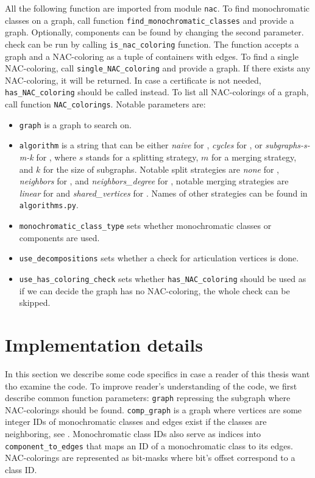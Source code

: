 All the following function are imported from module \texttt{nac}.
To find monochromatic classes on a graph,
call function \texttt{find\_monochromatic\_classes} and provide a graph.
Optionally, \trcon{} components can be found by changing the second parameter.
%
\IsNACColoring{} check can be run by calling \texttt{is\_nac\_coloring} function.
The function accepts a graph and a NAC-coloring
as a tuple of containers with edges.
%
To find a single NAC-coloring, call \texttt{single\_NAC\_coloring} and provide
a graph. If there exists any NAC-coloring, it will be returned.
In case a certificate is not needed,
\texttt{has\_NAC\_coloring} should be called instead.
%
To list all NAC-colorings of a graph, call function \texttt{NAC\_colorings}.
Notable parameters are:
\begin{itemize}
	\item \texttt{graph} is a graph to search on.
	\item \texttt{algorithm} is a string that can be either
	      \emph{naive} for \Naive{},
	      \emph{cycles} for \NaiveCycles{},
	      or \emph{subgraphs-{s}-{m}-{k}} for \Subgraphs{},
	      where \( s \) stands for a splitting strategy,
	      \( m \) for a merging strategy,
	      and \( k \) for the size of subgraphs.
	      Notable split strategies are
	      \emph{none} for \None{},
	      \emph{neighbors} for \Neighbors{}, and
	      \emph{neighbors\_degree} for \NeighborsDegree{},
	      notable merging strategies are
	      \emph{linear} for \MergeLinear{} and
	      \emph{shared\_vertices} for \SharedVertices{}.
	      Names of other strategies can be found in \texttt{algorithms.py}.
	\item \texttt{monochromatic\_class\_type} sets
	      whether monochromatic classes or \trcon{} components are used.
	\item \texttt{use\_decompositions} sets
	      whether a check for articulation vertices is done.
	\item \texttt{use\_has\_coloring\_check} sets
	      whether \texttt{has\_NAC\_coloring} should be used
	      as if we can decide the graph has no NAC-coloring,
	      the whole check can be skipped.
\end{itemize}



\section{Implementation details}

In this section we describe some code specifics
in case a reader of this thesis want tho examine the code.
%
To improve reader's understanding of the code,
we first describe common function parameters:
\texttt{graph} repressing the subgraph where NAC-colorings should be found.
%
\texttt{comp\_graph} is a graph where vertices are some integer IDs of monochromatic classes
and edges exist if the classes are neighboring,
see .
%
Monochromatic class IDs also serve as indices into \texttt{component\_to\_edges}
that maps an ID of a monochromatic class to its edges.
%
NAC-colorings are represented as bit-masks where bit's offset correspond to a class ID\@.

